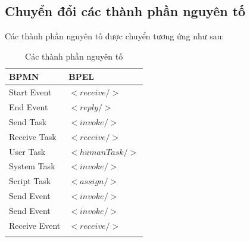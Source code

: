 \subsection{Chuyển đổi các thành phần nguyên tố}
Các thành phần nguyên tố được chuyển tương ứng như sau:
{
\setlength\extrarowheight{6pt}
\begin{longtable}{| p{4cm} | p{4cm} |}

    \hline
    \textbf{BPMN} & \textbf{BPEL}  \\
    \hline
    Start Event   & $<receive/>$   \\
    \hline
    End Event     & $<reply/>$     \\
    \hline
    Send Task     & $<invoke/>$    \\
    \hline
    Receive Task  & $<receive/>$   \\
    \hline
    User Task     & $<humanTask/>$ \\
    \hline
    System Task   & $<invoke/>$    \\
    \hline
    Script Task   & $<assign/>$    \\
    \hline
    Send Event    & $<invoke/>$    \\
    \hline
    Send Event    & $<invoke/>$    \\
    \hline
    Receive Event & $<receive/>$   \\
    \hline
    \caption{Các thành phần nguyên tố}
\end{longtable}

}

